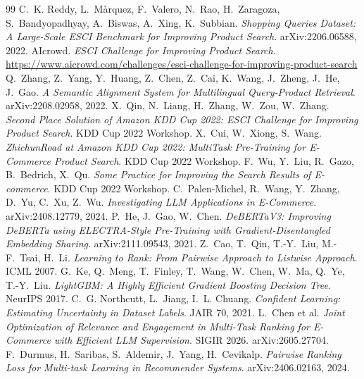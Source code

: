 \documentclass[11pt,a4paper]{article}
\begin{document}
\begin{thebibliography}{99}\small\setlength{\itemsep}{0pt}\setlength{\parskip}{0pt}
 C.~K. Reddy, L.~M\`arquez, F.~Valero, N.~Rao, H.~Zaragoza, S.~Bandyopadhyay, A.~Biswas, A.~Xing, K.~Subbian. \emph{Shopping Queries Dataset: A Large-Scale ESCI Benchmark for Improving Product Search}. arXiv:2206.06588, 2022.
 AIcrowd. \emph{ESCI Challenge for Improving Product Search}. \url{https://www.aicrowd.com/challenges/esci-challenge-for-improving-product-search}
 Q.~Zhang, Z.~Yang, Y.~Huang, Z.~Chen, Z.~Cai, K.~Wang, J.~Zheng, J.~He, J.~Gao. \emph{A Semantic Alignment System for Multilingual Query-Product Retrieval}. arXiv:2208.02958, 2022.
 X.~Qin, N.~Liang, H.~Zhang, W.~Zou, W.~Zhang. \emph{Second Place Solution of Amazon KDD Cup 2022: ESCI Challenge for Improving Product Search}. KDD Cup 2022 Workshop.
 X.~Cui, W.~Xiong, S.~Wang. \emph{ZhichunRoad at Amazon KDD Cup 2022: MultiTask Pre-Training for E-Commerce Product Search}. KDD Cup 2022 Workshop.
 F.~Wu, Y.~Liu, R.~Gazo, B.~Bedrich, X.~Qu. \emph{Some Practice for Improving the Search Results of E-commerce}. KDD Cup 2022 Workshop.
 C.~Palen-Michel, R.~Wang, Y.~Zhang, D.~Yu, C.~Xu, Z.~Wu. \emph{Investigating LLM Applications in E-Commerce}. arXiv:2408.12779, 2024.
 P.~He, J.~Gao, W.~Chen. \emph{DeBERTaV3: Improving DeBERTa using ELECTRA-Style Pre-Training with Gradient-Disentangled Embedding Sharing}. arXiv:2111.09543, 2021.
 Z.~Cao, T.~Qin, T.-Y.~Liu, M.-F.~Tsai, H.~Li. \emph{Learning to Rank: From Pairwise Approach to Listwise Approach}. ICML 2007.
 G.~Ke, Q.~Meng, T.~Finley, T.~Wang, W.~Chen, W.~Ma, Q.~Ye, T.-Y.~Liu. \emph{LightGBM: A Highly Efficient Gradient Boosting Decision Tree}. NeurIPS 2017.
 C.~G. Northcutt, L.~Jiang, I.~L. Chuang. \emph{Confident Learning: Estimating Uncertainty in Dataset Labels}. JAIR 70, 2021.
 L.~Chen et al. \emph{Joint Optimization of Relevance and Engagement in Multi-Task Ranking for E-Commerce with Efficient LLM Supervision}. SIGIR 2026. arXiv:2605.27704.
 F.~Durmus, H.~Saribas, S.~Aldemir, J.~Yang, H.~Cevikalp. \emph{Pairwise Ranking Loss for Multi-task Learning in Recommender Systems}. arXiv:2406.02163, 2024.
\end{thebibliography}
\end{document}
